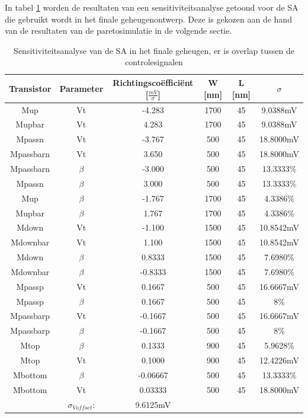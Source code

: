 In tabel \ref{tab:ourSA-sensanalysis-overlap} worden de resultaten van een sensitiviteitsanalyse getoond voor de SA die gebruikt wordt in het finale geheugenontwerp. Deze is gekozen aan de hand van de resultaten van de paretosimulatie in de volgende sectie.


\begin{table}
\begin{tabular}{cccccc}
\hline 
Transistor & Parameter & Richtingscoëfficiënt [$\frac{mV}{\sigma}$] & W [nm] & L [nm] & $\sigma$ \\ 
\hline 
Mup & Vt & -4.283 & 1700 & 45 & 9.0388mV \\ 
Mupbar & Vt & 4.283 & 1700 & 45 & 9.0388mV \\ 
Mpassn & Vt & -3.767 & 500 & 45 & 18.8000mV \\
Mpassbarn & Vt & 3.650 & 500 & 45 & 18.8000mV \\
Mpassbarn & $\beta$ & -3.000 & 500 & 45 & 13.3333\% \\ 
Mpassn & $\beta$ & 3.000 & 500 & 45 & 13.3333\% \\ 
Mup & $\beta$ & -1.767 & 1700 & 45 & 4.3386\% \\ 
Mupbar & $\beta$ & 1.767 & 1700 & 45 & 4.3386\% \\ 
Mdown & Vt & -1.100 & 1500 & 45 & 10.8542mV \\ 
Mdownbar & Vt & 1.100 & 1500 & 45 & 10.8542mV \\
Mdown & $\beta$ & 0.8333 & 1500 & 45 & 7.6980\% \\
Mdownbar & $\beta$ & -0.8333 & 1500 & 45 & 7.6980\% \\  
Mpassp & Vt & 0.1667 & 500 & 45 & 16.6667mV \\ 
Mpassp & $\beta$ & 0.1667 & 500 & 45 & 8\% \\ 
Mpassbarp & Vt & -0.1667 & 500 & 45 & 16.6667mV \\
Mpassbarp & $\beta$ & -0.1667 & 500 & 45 & 8\% \\ 
Mtop & $\beta$ & 0.1333 & 900 & 45 & 5.9628\% \\ 
Mtop & Vt & 0.1000 & 900 & 45 & 12.4226mV \\ 
Mbottom & $\beta$ & -0.06667 & 500 & 45 & 13.3333\% \\ 
Mbottom & Vt & 0.03333 & 500 & 45 & 18.8000mV \\ 
\hline 
\hline & $\sigma_{Voffset}$: & 9.6125mV & & & \\
\hline
\end{tabular} 
\caption[Sensitiviteitsanalyse van de SA in het finale geheugen]{Sensitiviteitsanalyse van de SA in het finale geheugen, er is overlap tussen de controlesignalen}
\label{tab:ourSA-sensanalysis-overlap}
\end{table}

